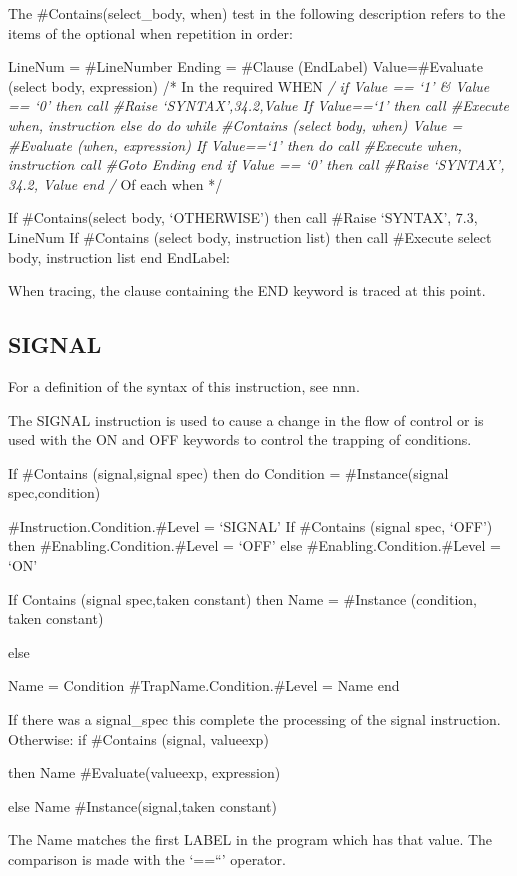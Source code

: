The \#Contains(select\_body, when) test in the following description
refers to the items of the optional when repetition in order:

LineNum = \#LineNumber Ending = \#Clause (EndLabel) Value=\#Evaluate
(select body, expression) /* In the required WHEN \emph{/ if Value ==
`1' \& Value == `0' then call \#Raise `SYNTAX',34.2,Value If Value==`1'
then call \#Execute when, instruction else do do while \#Contains
(select body, when) Value = \#Evaluate (when, expression) If Value==`1'
then do call \#Execute when, instruction call \#Goto Ending end if Value
== `0' then call \#Raise `SYNTAX', 34.2, Value end /} Of each when */

If \#Contains(select body, `OTHERWISE') then call \#Raise `SYNTAX', 7.3,
LineNum If \#Contains (select body, instruction list) then call
\#Execute select body, instruction list end EndLabel:

When tracing, the clause containing the END keyword is traced at this
point.

\subsection{SIGNAL}\label{signal}

For a definition of the syntax of this instruction, see nnn.

The SIGNAL instruction is used to cause a change in the flow of control
or is used with the ON and OFF keywords to control the trapping of
conditions.

If \#Contains (signal,signal spec) then do Condition = \#Instance(signal
spec,condition)

\#Instruction.Condition.\#Level = `SIGNAL' If \#Contains (signal spec,
`OFF') then \#Enabling.Condition.\#Level = `OFF' else
\#Enabling.Condition.\#Level = `ON'

If Contains (signal spec,taken constant) then Name = \#Instance
(condition, taken constant)

else

Name = Condition \#TrapName.Condition.\#Level = Name end

If there was a signal\_spec this complete the processing of the signal
instruction. Otherwise: if \#Contains (signal, valueexp)

then Name \#Evaluate(valueexp, expression)

else Name \#Instance(signal,taken constant)

The Name matches the first LABEL in the program which has that value.
The comparison is made with the `==``' operator.

